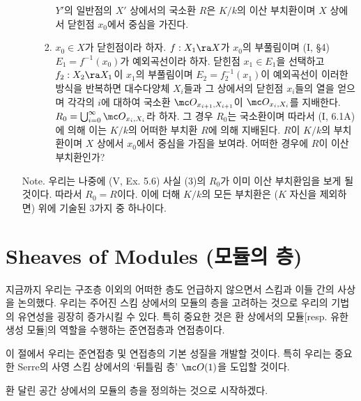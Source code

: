 \begin{enumerate}[label=\tb{4.\arabic*.},itemindent=0mm,itemsep=2mm]
\begin{enumerate}[label=(\alph*)]
\begin{enumerate}[label=(\arabic*)]
	$Y'$의 일반점의 $X'$ 상에서의 국소환 $R$은 $K/k$의 이산 부치환이며 $X$ 상에서 닫힌점 $x_0$에서 중심을 가진다.
	\item $x_0\in X$가 닫힌점이라 하자. $f:X_1\ra X$가 $x_0$의 부풀림이며 (I, \S 4) $E_1=f^{-1}(x_0)$가 예외곡선이라 하자.
	닫힌점 $x_1\in E_1$을 선택하고 $f_2:X_2\ra X_1$이 $x_1$의 부풀림이며 $E_2=f_2^{-1}(x_1)$이 예외곡선이
	이러한 방식을 반복하면 대수다양체 $X_i$들과 그 상에서의 닫힌점 $x_i$들의 열을 얻으며
	각각의 $i$에 대하여 국소환 $\mc O_{x_{i+1},X_{i+1}}$이 $\mc O_{x_i,X_i}$를 지배한다.
	$R_0=\bigcup_{i=0}^\infty\mc O_{x_i,X_i}$라 하자. 그 경우 $R_0$는 국소환이며
	따라서 (I, 6.1A)에 의해 이는 $K/k$의 어떠한 부치환 $R$에 의해 지배된다.
	$R$이 $K/k$의 부치환이며 $X$ 상에서 $x_0$에서 중심을 가짐을 보여라. 어떠한 경우에 $R$이 이산 부치환인가?
	\end{enumerate}
	\end{enumerate}
	Note. 우리는 나중에 (V, Ex. 5.6) 사실 (3)의 $R_0$가 이미 이산 부치환임을 보게 될 것이다. 따라서 $R_0=R$이다.
	이에 더해 $K/k$의 모든 부치환은 ($K$ 자신을 제외하면) 위에 기술된 3가지 중 하나이다.
	\end{enumerate}
	
	
	
	\section{Sheaves of Modules (모듈의 층)}
	
	지금까지 우리는 구조층 이외의 어떠한 층도 언급하지 않으면서 스킴과 이들 간의 사상을 논의했다.
	우리는 주어진 스킴 상에서의 모듈의 층을 고려하는 것으로 우리의 기법의 유연성을 굉장히 증가시킬 수 있다.
	특히 중요한 것은 환 상에서의 모듈[resp. 유한생성 모듈]의 역할을 수행하는 준연접층과 연접층이다.
	
	이 절에서 우리는 준연접층 및 연접층의 기본 성질을 개발할 것이다.
	특히 우리는 중요한 Serre의 사영 스킴 상에서의 `뒤틀림 층' $\mc O(1)$을 도입할 것이다.
	
	환 달린 공간 상에서의 모듈의 층을 정의하는 것으로 시작하겠다.
	
